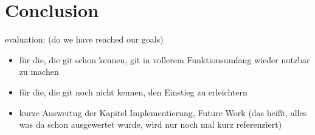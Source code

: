 \section{Conclusion}
\label{sec:Conclusion}

evaluation: (do we have reached our goals)
\begin{itemize}
	\item für die, die git schon kennen, git in vollerem Funktionsumfang wieder
nutzbar zu machen
	\item für die, die git noch nicht kennen, den Einstieg zu erleichtern
	\item kurze Auswertug der Kapitel Implementierung, Future Work (das heißt,
alles was da schon ausgewertet wurde, wird nur noch mal kurz referenziert)
\end{itemize}